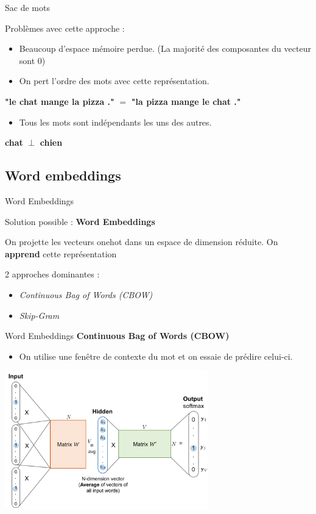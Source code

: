 \documentclass[french]{beamer}
\begin{document}
\begin{frame}{Sac de mots}

Problèmes avec cette approche :
\begin{itemize}
	\item Beaucoup d'espace mémoire perdue. (La majorité des composantes du vecteur sont $0$)
	\item On pert l'ordre des mots avec cette représentation.
\end{itemize}
\centering
\textbf{"le chat mange la pizza ."} $=$ \textbf{"la pizza mange le chat ."}

\raggedleft
\begin{itemize}
	\item Tous les mots sont indépendants les uns des autres.
\end{itemize}
\centering
\textbf{chat} $\perp$ \textbf{chien}

\end{frame}


\subsection{Word embeddings}

\begin{frame}{Word Embeddings}

\centering
{\Large Solution possible : \textbf{Word Embeddings} \cite{bengio2003neural}\cite{mikolov2013efficient}}
\vspace{.5cm}

\raggedright
On projette les vecteurs onehot dans un espace de dimension réduite. On \textbf{apprend} cette représentation
\vspace{.5cm}

2 approches dominantes :
\begin{itemize}
	\item \textit{Continuous Bag of Words (CBOW)}
	\item \textit{Skip-Gram}
\end{itemize}

\end{frame}

\begin{frame}{Word Embeddings}
\textbf{Continuous Bag of Words (CBOW)}
\begin{itemize}
	\item On utilise une fenêtre de contexte du mot et on essaie de prédire celui-ci.
\end{itemize}
\centering
\includegraphics[height=6cm]{figures/word2vec-cbow.png}
\end{frame}
\end{document}
